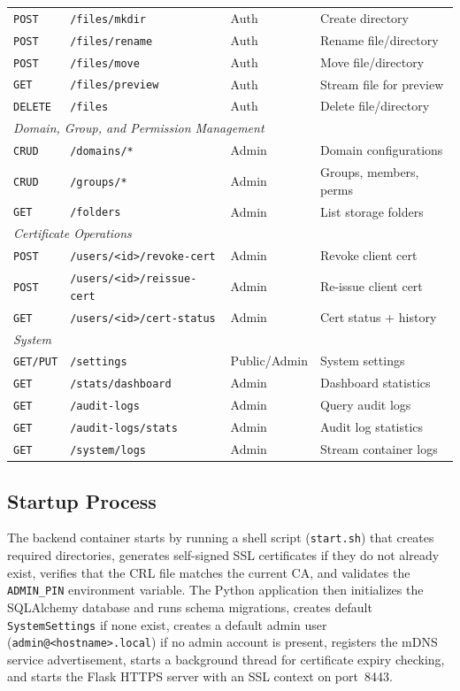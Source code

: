 \documentclass[12pt,letterpaper]{report}
\begin{document}
\begin{table}[ht]
\begin{tabular}{llll}
\texttt{POST} & \texttt{/files/mkdir} & Auth & Create directory \\
\texttt{POST} & \texttt{/files/rename} & Auth & Rename file/directory \\
\texttt{POST} & \texttt{/files/move} & Auth & Move file/directory \\
\texttt{GET} & \texttt{/files/preview} & Auth & Stream file for preview \\
\texttt{DELETE} & \texttt{/files} & Auth & Delete file/directory \\
\hline
\multicolumn{4}{l}{\textit{Domain, Group, and Permission Management}} \\
\texttt{CRUD} & \texttt{/domains/*} & Admin & Domain configurations \\
\texttt{CRUD} & \texttt{/groups/*} & Admin & Groups, members, perms \\
\texttt{GET} & \texttt{/folders} & Admin & List storage folders \\
\hline
\multicolumn{4}{l}{\textit{Certificate Operations}} \\
\texttt{POST} & \texttt{/users/<id>/revoke-cert} & Admin & Revoke client cert \\
\texttt{POST} & \texttt{/users/<id>/reissue-cert} & Admin & Re-issue client cert \\
\texttt{GET} & \texttt{/users/<id>/cert-status} & Admin & Cert status + history \\
\hline
\multicolumn{4}{l}{\textit{System}} \\
\texttt{GET/PUT} & \texttt{/settings} & Public/Admin & System settings \\
\texttt{GET} & \texttt{/stats/dashboard} & Admin & Dashboard statistics \\
\texttt{GET} & \texttt{/audit-logs} & Admin & Query audit logs \\
\texttt{GET} & \texttt{/audit-logs/stats} & Admin & Audit log statistics \\
\texttt{GET} & \texttt{/system/logs} & Admin & Stream container logs \\
\hline
\end{tabular}
\end{table}

\subsection{Startup Process}

The backend container starts by running a shell script (\texttt{start.sh}) that creates required directories, generates self-signed SSL certificates if they do not already exist, verifies that the CRL file matches the current CA, and validates the \texttt{ADMIN\_PIN} environment variable. The Python application then initializes the SQLAlchemy database and runs schema migrations, creates default \texttt{SystemSettings} if none exist, creates a default admin user (\texttt{admin@<hostname>.local}) if no admin account is present, registers the mDNS service advertisement, starts a background thread for certificate expiry checking, and starts the Flask HTTPS server with an SSL context on port~8443.
\end{document}
